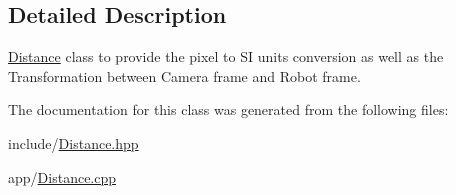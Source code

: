 \subsection{Detailed Description}
\hyperlink{classDistance}{Distance} class to provide the pixel to SI units conversion as well as the Transformation between Camera frame and Robot frame. 

The documentation for this class was generated from the following files\+:\begin{DoxyCompactItemize}
\item 
include/\hyperlink{Distance_8hpp}{Distance.\+hpp}\item 
app/\hyperlink{Distance_8cpp}{Distance.\+cpp}\end{DoxyCompactItemize}

